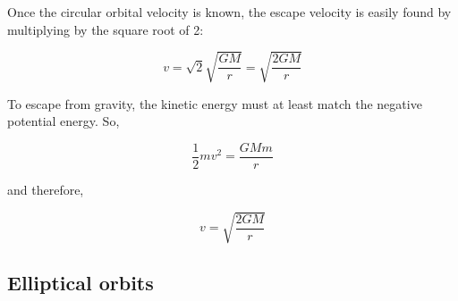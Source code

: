 \documentclass{article}
\begin{document}
Once the circular orbital velocity is known, the escape velocity is easily found by multiplying by the square root of 2:

\[v=\sqrt{2}\sqrt{\frac{GM}{r}}=\sqrt{\frac{2GM}{r}}\]

To escape from gravity, the kinetic energy must at least match the negative potential energy. So,

\[\frac{1}{2}mv^{2}=\frac{GMm}{r}\]

and therefore,

\[v=\sqrt{\frac{2GM}{r}}\]

\subsection{Elliptical orbits}
\end{document}
